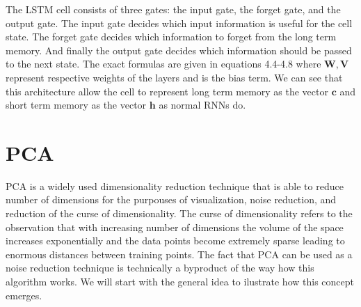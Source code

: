 
The \ac{LSTM} cell consists of three gates: the input gate, the forget gate, and the output gate.
The input gate decides which input information is useful for the cell state. 
The forget gate decides which information to forget from the long term memory.
And finally the output gate decides which information should be passed to the next state.
The exact formulas are given in equations 4.4-4.8 where $\mathbf{W}, \mathbf{V}$ 
represent respective weights of the layers and  is the bias term. 
We can see that this architecture allow the cell to represent long term
memory as the vector $\textbf{c}$ and short term memory
as the vector $\textbf{h}$ as normal \ac{RNN}s do. 







\section{\acl{PCA}}

\ac{PCA} is a widely used dimensionality reduction technique that is able
to reduce number of dimensions for the purpouses of visualization, noise reduction, and
reduction of the curse of dimensionality. The curse of 
dimensionality refers to the observation that with increasing number of 
dimensions the volume of the space increases exponentially and the data points become
extremely sparse leading to enormous distances between training points.
The fact that \ac{PCA} can be used as a noise reduction technique is 
technically a byproduct of the way how this algorithm works. We will start with the
general idea to ilustrate how this concept emerges.



